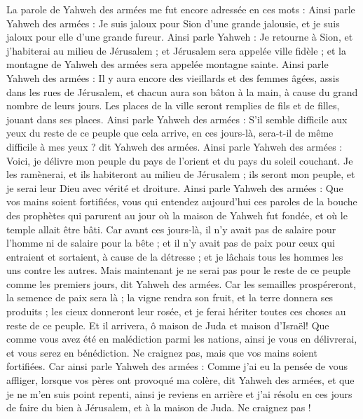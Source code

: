 \begin{multicols}{2}
\VerseOne{}La parole de Yahweh des armées me fut encore adressée en ces mots :
Ainsi parle Yahweh des armées : Je suis jaloux pour Sion d'une grande jalousie, et je suis jaloux pour elle d'une grande fureur.
Ainsi parle Yahweh : Je retourne à Sion, et j'habiterai au milieu de Jérusalem ; et Jérusalem sera appelée ville fidèle ; et la montagne de Yahweh des armées sera appelée montagne sainte.
Ainsi parle Yahweh des armées : Il y aura encore des vieillards et des femmes âgées, assis dans les rues de Jérusalem, et chacun aura son bâton à la main, à cause du grand nombre de leurs jours.
Les places de la ville seront remplies de fils et de filles, jouant dans ses places.
Ainsi parle Yahweh des armées : S'il semble difficile aux yeux du reste de ce peuple que cela arrive, en ces jours-là, sera-t-il de même difficile à mes yeux ? dit Yahweh des armées.
Ainsi parle Yahweh des armées : Voici, je délivre mon peuple du pays de l'orient et du pays du soleil couchant.
Je les ramènerai, et ils habiteront au milieu de Jérusalem ; ils seront mon peuple, et je serai leur Dieu avec vérité et droiture.
Ainsi parle Yahweh des armées : Que vos mains soient fortifiées, vous qui entendez aujourd'hui ces paroles de la bouche des prophètes qui parurent au jour où la maison de Yahweh fut fondée, et où le temple allait être bâti.
Car avant ces jours-là, il n'y avait pas de salaire pour l'homme ni de salaire pour la bête ; et il n'y avait pas de paix pour ceux qui entraient et sortaient, à cause de la détresse ; et je lâchais tous les hommes les uns contre les autres.
Mais maintenant je ne serai pas pour le reste de ce peuple comme les premiers jours, dit Yahweh des armées.
Car les semailles prospéreront, la semence de paix sera là ; la vigne rendra son fruit, et la terre donnera ses produits ; les cieux donneront leur rosée, et je ferai hériter toutes ces choses au reste de ce peuple.
Et il arrivera, ô maison de Juda et maison d'Israël! Que comme vous avez été en malédiction parmi les nations, ainsi je vous en délivrerai, et vous serez en bénédiction. Ne craignez pas, mais que vos mains soient fortifiées.
Car ainsi parle Yahweh des armées : Comme j'ai eu la pensée de vous affliger, lorsque vos pères ont provoqué ma colère, dit Yahweh des armées, et que je ne m'en suis point repenti,
ainsi je reviens en arrière et j'ai résolu en ces jours de faire du bien à Jérusalem, et à la maison de Juda. Ne craignez pas !

\end{multicols}
